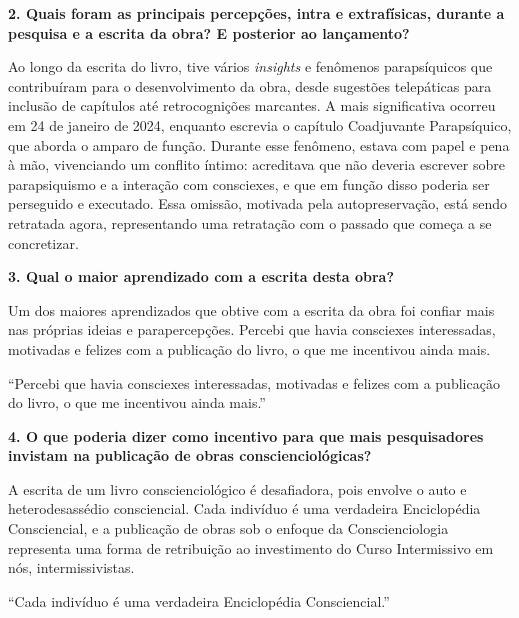 \documentclass{gescons}
\begin{document}
\begin{multicols}{2}
\textbf{2. Quais foram as principais percepções, intra e extrafísicas, durante a pesquisa e a escrita da obra? E posterior ao lançamento?}

Ao longo da escrita do livro, tive vários \emph{insights} e fenômenos parapsíquicos que contribuíram para o desenvolvimento da obra, desde sugestões telepáticas para inclusão de capítulos até retrocognições marcantes. A mais significativa ocorreu em 24 de janeiro de 2024, enquanto escrevia o capítulo Coadjuvante Parapsíquico, que aborda o amparo de função. Durante esse fenômeno, estava com papel e pena à mão, vivenciando um conflito íntimo: acreditava que não deveria escrever sobre parapsiquismo e a interação com consciexes, e que em função disso poderia ser perseguido e executado. Essa omissão, motivada pela autopreservação, está sendo retratada agora, representando uma retratação com o passado que começa a se concretizar.

\textbf{3. Qual o maior aprendizado com a escrita desta obra?}

Um dos maiores aprendizados que obtive com a escrita da obra foi confiar mais nas próprias ideias e parapercepções. Percebi que havia consciexes interessadas, motivadas e felizes com a publicação do livro, o que me incentivou ainda mais.

\begin{pullquote}
``Percebi que havia consciexes interessadas, motivadas e felizes com a publicação do livro, o que me incentivou ainda mais.''
\end{pullquote}

\textbf{4. O que poderia dizer como incentivo para que mais pesquisadores invistam na publicação de obras conscienciológicas?}

A escrita de um livro conscienciológico é desafiadora, pois envolve o auto e heterodesassédio consciencial. Cada indivíduo é uma verdadeira Enciclopédia Consciencial, e a publicação de obras sob o enfoque da Conscienciologia representa uma forma de retribuição ao investimento do Curso Intermissivo em nós, intermissivistas.


\begin{pullquote}
``Cada indivíduo é uma verdadeira Enciclopédia Consciencial.''
\end{pullquote}

    
    \end{multicols}
\end{document}
